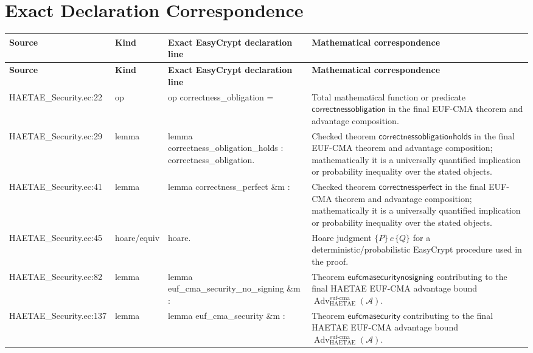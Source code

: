 \documentclass[10pt]{article}
\newcommand{\Adv}{\operatorname{Adv}}
\begin{document}
\section*{Exact Declaration Correspondence}
\tiny
\begin{longtable}{L{0.11\textwidth}L{0.055\textwidth}L{0.385\textwidth}L{0.41\textwidth}}
\toprule
\textbf{Source} & \textbf{Kind} & \textbf{Exact EasyCrypt declaration line} & \textbf{Mathematical correspondence}\\
\midrule
\endfirsthead
\toprule
\textbf{Source} & \textbf{Kind} & \textbf{Exact EasyCrypt declaration line} & \textbf{Mathematical correspondence}\\
\midrule
\endhead
HAETAE\_\allowbreak{}Security.\allowbreak{}ec:\allowbreak{}22 & op & {\ttfamily\scriptsize op correctness\_\allowbreak{}obligation =} & Total mathematical function or predicate $\mathsf{correctnessobligation}$ in the final EUF-CMA theorem and advantage composition. \\
HAETAE\_\allowbreak{}Security.\allowbreak{}ec:\allowbreak{}29 & lemma & {\ttfamily\scriptsize lemma correctness\_\allowbreak{}obligation\_\allowbreak{}holds : correctness\_\allowbreak{}obligation.} & Checked theorem $\mathsf{correctnessobligationholds}$ in the final EUF-CMA theorem and advantage composition; mathematically it is a universally quantified implication or probability inequality over the stated objects. \\
HAETAE\_\allowbreak{}Security.\allowbreak{}ec:\allowbreak{}41 & lemma & {\ttfamily\scriptsize lemma correctness\_\allowbreak{}perfect \&m :} & Checked theorem $\mathsf{correctnessperfect}$ in the final EUF-CMA theorem and advantage composition; mathematically it is a universally quantified implication or probability inequality over the stated objects. \\
HAETAE\_\allowbreak{}Security.\allowbreak{}ec:\allowbreak{}45 & hoare/equiv & {\ttfamily\scriptsize hoare.} & Hoare judgment $\{P\}\,c\,\{Q\}$ for a deterministic/probabilistic EasyCrypt procedure used in the proof. \\
HAETAE\_\allowbreak{}Security.\allowbreak{}ec:\allowbreak{}82 & lemma & {\ttfamily\scriptsize lemma euf\_\allowbreak{}cma\_\allowbreak{}security\_\allowbreak{}no\_\allowbreak{}signing \&m :} & Theorem $\mathsf{eufcmasecuritynosigning}$ contributing to the final HAETAE EUF-CMA advantage bound $\Adv_{\mathrm{HAETAE}}^{\mathrm{euf\mbox{-}cma}}(\mathcal A)$. \\
HAETAE\_\allowbreak{}Security.\allowbreak{}ec:\allowbreak{}137 & lemma & {\ttfamily\scriptsize lemma euf\_\allowbreak{}cma\_\allowbreak{}security \&m :} & Theorem $\mathsf{eufcmasecurity}$ contributing to the final HAETAE EUF-CMA advantage bound $\Adv_{\mathrm{HAETAE}}^{\mathrm{euf\mbox{-}cma}}(\mathcal A)$. \\

\end{longtable}
\end{document}
